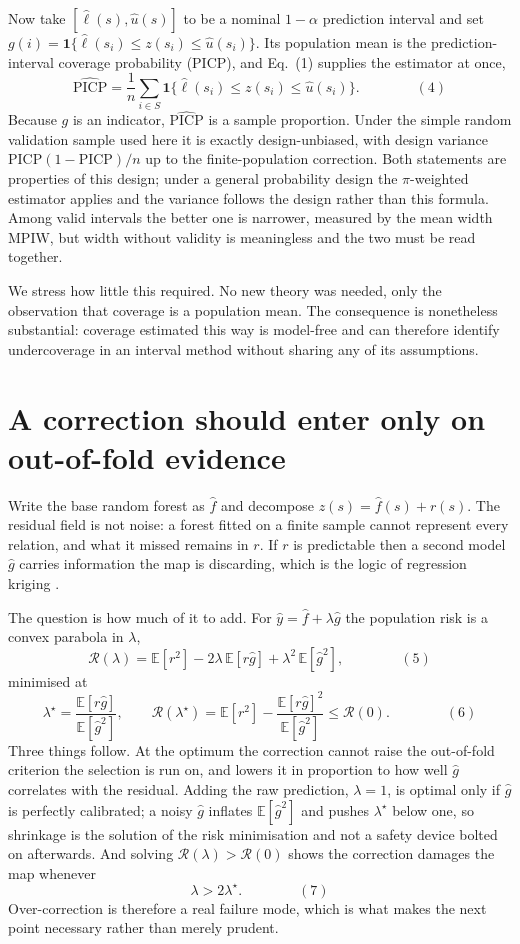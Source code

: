 \documentclass[preprint,12pt,authoryear]{elsarticle}
\newcommand{\eqnum}[1]{\qquad\qquad\mathrm{(#1)}}
\begin{document}
Now take $[\hat \ell(s), \hat u(s)]$ to be a nominal $1-\alpha$ prediction
interval and set $g(i) = \mathbf{1}\{\hat \ell(s_i) \le z(s_i) \le \hat u(s_i)\}$.
Its population mean is the prediction-interval coverage probability (PICP), and
Eq.~(1) supplies the estimator at once,
\[
\widehat{\mathrm{PICP}} = \frac{1}{n}\sum_{i \in S}
\mathbf{1}\{\hat \ell(s_i) \le z(s_i) \le \hat u(s_i)\}.
\eqnum{4}
\]
Because $g$ is an indicator, $\widehat{\mathrm{PICP}}$ is a sample proportion.
Under the simple random validation sample used here it is exactly
design-unbiased, with design variance $\mathrm{PICP}(1-\mathrm{PICP})/n$ up to
the finite-population correction. Both statements are properties of this design;
under a general probability design the $\pi$-weighted estimator applies and the
variance follows the design rather than this formula. Among
valid intervals the better one is narrower, measured by the mean width
$\mathrm{MPIW}$, but width without validity is meaningless and the two must be
read together.

We stress how little this required. No new theory was needed, only the
observation that coverage is a population mean. The consequence is nonetheless
substantial: coverage estimated this way is model-free and can therefore
identify undercoverage in
an interval method without sharing any of its assumptions.

\section{A correction should enter only on out-of-fold evidence}
\label{sec:correction}

Write the base random forest \citep{breiman2001} as $\hat f$ and decompose
$z(s) = \hat f(s) + r(s)$. The residual field is not noise: a forest fitted on a
finite sample cannot represent every relation, and what it missed remains in
$r$. If $r$ is predictable then a second model $\hat g$ carries information the
map is discarding, which is the logic of regression kriging \citep{hengl2018}.

The question is how much of it to add. For $\hat y = \hat f + \lambda \hat g$
the population risk is a convex parabola in $\lambda$,
\[
\mathcal{R}(\lambda)
= \mathbb{E}[r^2] - 2\lambda\,\mathbb{E}[r\hat g] + \lambda^2\,\mathbb{E}[\hat g^2],
\eqnum{5}
\]
minimised at
\[
\lambda^\star = \frac{\mathbb{E}[r\hat g]}{\mathbb{E}[\hat g^2]},
\qquad
\mathcal{R}(\lambda^\star) = \mathbb{E}[r^2]
- \frac{\mathbb{E}[r\hat g]^2}{\mathbb{E}[\hat g^2]} \le \mathcal{R}(0).
\eqnum{6}
\]
Three things follow. At the optimum the correction cannot raise the out-of-fold
criterion the selection is run on, and lowers it in
proportion to how well $\hat g$ correlates with the residual. Adding the raw
prediction, $\lambda = 1$, is optimal only if $\hat g$ is perfectly calibrated;
a noisy $\hat g$ inflates $\mathbb{E}[\hat g^2]$ and pushes $\lambda^\star$
below one, so shrinkage is the solution of the risk minimisation and not a
safety device bolted on afterwards. And solving
$\mathcal{R}(\lambda) > \mathcal{R}(0)$ shows the correction damages the map
whenever
\[
\lambda > 2\lambda^\star .
\eqnum{7}
\]
Over-correction is therefore a real failure mode, which is what makes the next
point necessary rather than merely prudent.
\end{document}

